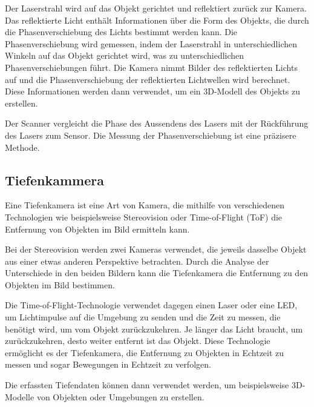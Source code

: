 Der Laserstrahl wird auf das Objekt gerichtet und reflektiert zurück zur Kamera. Das reflektierte Licht enthält Informationen über die Form des Objekts, die durch die Phasenverschiebung des Lichts bestimmt werden kann. Die Phasenverschiebung wird gemessen, indem der Laserstrahl in unterschiedlichen Winkeln auf das Objekt gerichtet wird, was zu unterschiedlichen Phasenverschiebungen führt. Die Kamera nimmt Bilder des reflektierten Lichts auf und die Phasenverschiebung der reflektierten Lichtwellen wird berechnet. Diese Informationen werden dann verwendet, um ein 3D-Modell des Objekts zu erstellen.

Der Scanner vergleicht die Phase des Aussendens des Lasers mit der Rückführung des Lasers zum Sensor. Die Messung der Phasenverschiebung ist eine präzisere Methode.

\subsection{Tiefenkammera}
Eine Tiefenkamera ist eine Art von Kamera, die mithilfe von verschiedenen Technologien wie beispielsweise Stereovision oder Time-of-Flight (ToF) die Entfernung von Objekten im Bild ermitteln kann.

Bei der Stereovision werden zwei Kameras verwendet, die jeweils dasselbe Objekt aus einer etwas anderen Perspektive betrachten. Durch die Analyse der Unterschiede in den beiden Bildern kann die Tiefenkamera die Entfernung zu den Objekten im Bild bestimmen.

Die Time-of-Flight-Technologie verwendet dagegen einen Laser oder eine LED, um Lichtimpulse auf die Umgebung zu senden und die Zeit zu messen, die benötigt wird, um vom Objekt zurückzukehren. Je länger das Licht braucht, um zurückzukehren, desto weiter entfernt ist das Objekt. Diese Technologie ermöglicht es der Tiefenkamera, die Entfernung zu Objekten in Echtzeit zu messen und sogar Bewegungen in Echtzeit zu verfolgen.

Die erfassten Tiefendaten können dann verwendet werden, um beispielsweise 3D-Modelle von Objekten oder Umgebungen zu erstellen.

